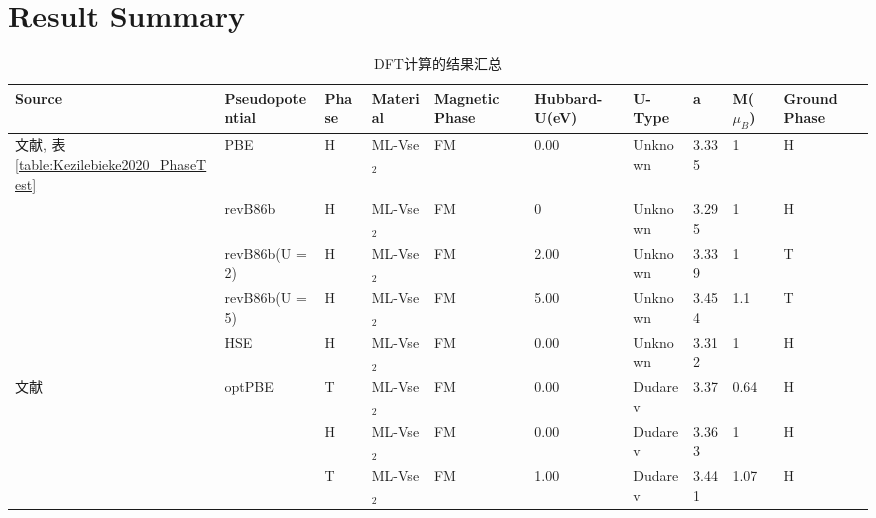 \documentclass[reprint, aps, prb, showkeys]{revtex4-2}
\begin{document}
\section{Result Summary}
\begin{table*}
    \caption{\label{table:Result_Summary} DFT计算的结果汇总}
    \begin{ruledtabular}
        \begin{tabular}{llllllllll}
            Source                                                             & Pseudopotential & Phase & Material        & Magnetic Phase & Hubbard-U(eV) & U-Type             & a     & M($\mu_B$) & Ground Phase \\
            \hline
            文献\cite{Kezilebieke2020},   表\ref{table:Kezilebieke2020_PhaseTest} & PBE             & H     & ML-Vse$_2$      & FM             & 0.00          & Unknown            & 3.335 & 1          & H            \\
                                                                               & revB86b         & H     & ML-Vse$_2$      & FM             & 0             & Unknown            & 3.295 & 1          & H            \\
                                                                               & revB86b(U = 2)  & H     & ML-Vse$_2$      & FM             & 2.00          & Unknown            & 3.339 & 1          & T            \\
                                                                               & revB86b(U = 5)  & H     & ML-Vse$_2$      & FM             & 5.00          & Unknown            & 3.454 & 1.1        & T            \\
                                                                               & HSE             & H     & ML-Vse$_2$      & FM             & 0.00          & Unknown            & 3.312 & 1          & H            \\
            文献\cite{PhysRevB.96.235147}                                        & optPBE          & T     & ML-Vse$_2$      & FM             & 0.00          & Dudarev & 3.37  & 0.64       & H            \\
                                                                               &                 & H     & ML-Vse$_2$      & FM             & 0.00          & Dudarev & 3.363 & 1          & H            \\
                                                                               &                 & T     & ML-Vse$_2$      & FM             & 1.00          & Dudarev & 3.441 & 1.07       & H            \\

\end{tabular}
\end{ruledtabular}
\end{table*}
\end{document}
